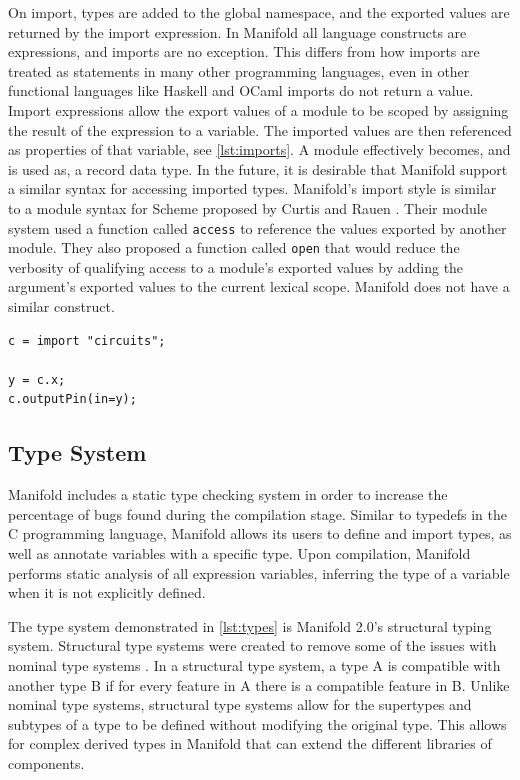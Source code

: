 On import, types are added to the global namespace, and the exported values are returned by the import
expression. In Manifold all language constructs are
expressions, and imports are no exception. This differs from how imports are
treated as statements in many other
programming languages, even in other functional languages like Haskell and
OCaml imports do not return a value.  Import expressions allow the
export values of a module to be scoped by assigning the result of the expression
to a variable. The imported values are then referenced as properties of that
variable, see \autoref{lst:imports}. A module effectively becomes, and is used as,
a record data type. In the future, it is desirable that Manifold support a
similar syntax for accessing imported types.
Manifold's import style is similar to a module syntax for Scheme proposed by
Curtis and Rauen \cite{Curtis:1990:MSS:91556.91573}. Their module system used
a function called \texttt{access} to reference the values exported by another
module. They also proposed a function called \texttt{open} that would reduce
the verbosity of qualifying access to a module's exported values by adding the
argument's exported values to the current lexical scope. Manifold does not
have a similar construct.

\begin{lstlisting}[label=lst:imports, caption=A module imported into a Manifold file]
c = import "circuits";

y = c.x;
c.outputPin(in=y);
\end{lstlisting}

\subsection{Type System}

Manifold includes a static type checking system in order to increase the percentage of bugs found during
the compilation stage. Similar to typedefs in the C
programming language, Manifold allows its users to define and import types,
as well as annotate variables with a specific type. Upon compilation,
Manifold performs static analysis of all expression variables, inferring the type of a variable when it
is not explicitly defined.

The type system demonstrated in \autoref{lst:types} is Manifold 2.0's structural typing system.
Structural type systems were
created to remove some of the issues with nominal type systems
\cite{Gil:2008:WIS:1449764.1449771}. In a structural
type system, a type A is compatible with another type B if for every feature in
A there is a compatible feature in B. Unlike nominal type systems, structural
type systems allow for the supertypes and subtypes of a type to be defined without
modifying the original type. This allows for complex derived types in Manifold that
can extend the different libraries of components.

